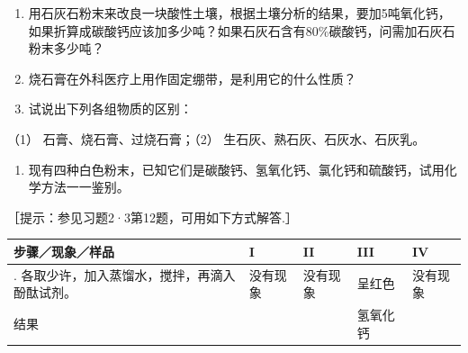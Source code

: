 \begin{enumerate}[start=6]
\item
  用石灰石粉末来改良一块酸性土壤，根据土壤分析的结果，要加5吨氧化钙，如果折算成碳酸钙应该加多少吨？如果石灰石含有80\%碳酸钙，问需加石灰石粉末多少吨？
\item
  烧石膏在外科医疗上用作固定绷带，是利用它的什么性质？
\item
  试说出下列各组物质的区别：
\end{enumerate}

（1） 石膏、烧石膏、过烧石膏；（2） 生石灰、熟石灰、石灰水、石灰乳。

\begin{enumerate}[start=9]
\item
  现有四种白色粉末，已知它们是碳酸钙、氢氧化钙、氯化钙和硫酸钙，试用化学方法一一鉴别。
\end{enumerate}

［提示：参见习题2·3第12题，可用如下方式解答.］

{\def\LTcaptype{none} %
\begin{longtable}[]{@{}
  >{\raggedright\arraybackslash}p{}
  >{\raggedright\arraybackslash}p{}
  >{\raggedright\arraybackslash}p{}
  >{\raggedright\arraybackslash}p{}
  >{\raggedright\arraybackslash}p{}@{}}
\toprule\noalign{}
\begin{minipage}[b]{\linewidth}\raggedright
步骤／现象／样品
\end{minipage} & \begin{minipage}[b]{\linewidth}\raggedright
I
\end{minipage} & \begin{minipage}[b]{\linewidth}\raggedright
II
\end{minipage} & \begin{minipage}[b]{\linewidth}\raggedright
III
\end{minipage} & \begin{minipage}[b]{\linewidth}\raggedright
IV
\end{minipage} \\
\midrule\noalign{}
\endhead
\bottomrule\noalign{}
\endlastfoot
1. 各取少许，加入蒸馏水，搅拌，再滴入酚酞试剂。 & 没有现象 & 没有现象 &
呈红色 & 没有现象 \\
结果 & & & 氢氧化钙 & \\
\end{longtable}
}

